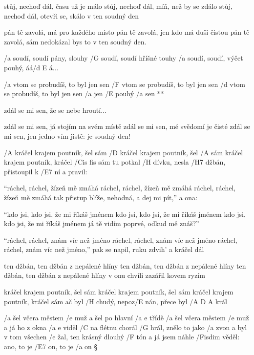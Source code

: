 stůj, nechoď dál, času už je málo
stůj, nechoď dál, míň, než by se zdálo
stůj, nechoď dál, otevři se, skálo
v ten soudný den \s

pán tě zavolá, má pro každého místo
pán tě zavolá, jen kdo má duši čistou
pán tě zavolá, sám nedokázal bys to
v ten soudný den.

\R  /a soudí, soudí pány, slouhy
    /G soudí, soudí hříšné touhy
    /a soudí, soudí, výčet pouhý, áá/{d E} á...

    /a vtom se probudíš, to byl jen sen
    /F vtom se probudíš, to byl jen sen
    /d vtom se probudíš, to byl jen sen
    /a jen /E pouhý /a sen **

zdál se mi sen, že se nebe hroutí...\s

zdál se mi sen, já stojím na svém místě
zdál se mi sen, mé svědomí je čisté
zdál se mi sen, jen jedno vím jistě:
je  soudný den!



/A kráčel krajem poutník, šel sám
/D kráčel krajem poutník, šel /A sám
kráčel krajem poutník, kráčel /{Cis fis} sám
tu potkal /H dívku, nesla /H7 džbán, přistoupil k /E7 ní a pravil: \s

``ráchel, ráchel, žízeň mě zmáhá
ráchel, ráchel, žízeň mě zmáhá
ráchel, ráchel, žízeň mě zmáhá
tak přistup blíže, nehodná, a dej mi pít,'' a ona: \s

``kdo jsi, kdo jsi, že mi říkáš jménem
kdo jsi, kdo jsi, že mi říkáš jménem
kdo jsi, kdo jsi, že mi říkáš jménem
já tě vidím poprvé, odkud mě znáš?'' \s

``ráchel, ráchel, znám víc než jméno
ráchel, ráchel, znám víc než jméno
ráchel, ráchel, znám víc než jméno,''
pak se napil, ruku zdvih' a kráčel dál \s

ten džbán, ten džbán z nepálené hlíny
ten džbán, ten džbán z nepálené hlíny
ten džbán, ten džbán z nepálené hlíny
v onu chvíli zazářil kovem ryzím \s

kráčel krajem poutník, šel sám
kráčel krajem poutník, šel sám
kráčel krajem poutník, kráčel sám
ač byl /H chudý, nepoz/E nán, přece byl /{A D A} král




/a šel včera městem /e muž a šel po hlavní /{a e} třídě
/a šel včera městem /e muž a já ho z okna /{a e} viděl
/C na flétnu chorál /G hrál, znělo to jako /a zvon
a byl v tom všechen /e žal, ten krásný dlouhý /F tón
a já jsem náhle /Fisdim věděl: ano, to je /E7 on, to je /a on \S

